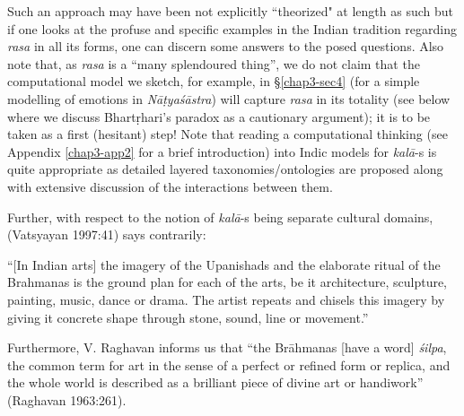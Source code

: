 Such an approach may have been not explicitly “theorized" at length as such but if one looks at the profuse and specific examples in the Indian tradition regarding \textsl{rasa} in all its forms, one can discern some answers to the posed questions. Also note that, as \textsl{rasa} is a “many splendoured thing”, we do not claim that the computational model we sketch, for example, in \S\ref{chap3-sec4} (for a simple modelling of emotions in \textsl{Nāṭyaśāstra}) will capture \textsl{rasa} in its totality (see below where we discuss Bhartṛhari’s paradox as a cautionary argument); it is to be taken as a first (hesitant) step! Note that reading a computational thinking (see Appendix \ref{chap3-app2} for a brief introduction) into Indic models for \textsl{kalā}-s is quite appropriate as detailed layered taxonomies/ontologies are proposed along with extensive discussion of the interactions between them.

Further, with respect to the notion of \textsl{kalā}-s being separate cultural domains, (Vatsyayan
 1997:41) says contrarily:

\newpage

\begin{myquote}
“[In Indian arts] the imagery of the Upanishads and the elaborate ritual of the Brahmanas is the ground plan for each of the arts, be it architecture, sculpture, painting, music, dance or drama. The artist repeats and chisels this imagery by giving it concrete shape through stone, sound, line or movement.”
\end{myquote}

Furthermore, V. Raghavan informs us that “the Brāhmanas [have a word] \textsl{śilpa}, the common term for art in the sense of a perfect or refined form or replica, and the whole world is described as a brilliant piece of divine art or handiwork” (Raghavan 1963:261).


